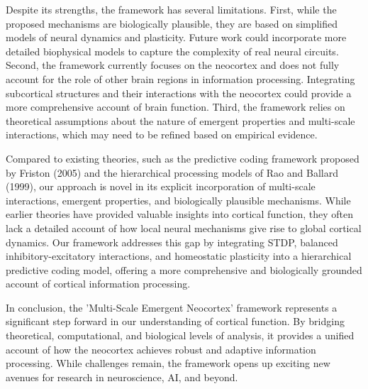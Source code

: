 \documentclass{article}
\begin{document}
Despite its strengths, the framework has several limitations. First, while the proposed mechanisms are biologically plausible, they are based on simplified models of neural dynamics and plasticity. Future work could incorporate more detailed biophysical models to capture the complexity of real neural circuits. Second, the framework currently focuses on the neocortex and does not fully account for the role of other brain regions in information processing. Integrating subcortical structures and their interactions with the neocortex could provide a more comprehensive account of brain function. Third, the framework relies on theoretical assumptions about the nature of emergent properties and multi-scale interactions, which may need to be refined based on empirical evidence.

Compared to existing theories, such as the predictive coding framework proposed by Friston (2005) and the hierarchical processing models of Rao and Ballard (1999), our approach is novel in its explicit incorporation of multi-scale interactions, emergent properties, and biologically plausible mechanisms. While earlier theories have provided valuable insights into cortical function, they often lack a detailed account of how local neural mechanisms give rise to global cortical dynamics. Our framework addresses this gap by integrating STDP, balanced inhibitory-excitatory interactions, and homeostatic plasticity into a hierarchical predictive coding model, offering a more comprehensive and biologically grounded account of cortical information processing.

In conclusion, the 'Multi-Scale Emergent Neocortex' framework represents a significant step forward in our understanding of cortical function. By bridging theoretical, computational, and biological levels of analysis, it provides a unified account of how the neocortex achieves robust and adaptive information processing. While challenges remain, the framework opens up exciting new avenues for research in neuroscience, AI, and beyond.
\end{document}
